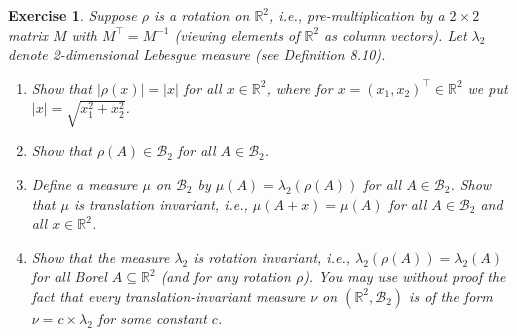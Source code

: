 \documentclass{article}
\newtheorem{exercise}[theorem]{Exercise}
\begin{document}
\begin{exercise}
    Suppose $\rho$ is a rotation on $\mathbb{R}^2$, i.e., pre-multiplication by a $2 \times 2$ matrix $M$ with $M^\top = M^{-1}$ (viewing elements of $\mathbb{R}^2$ as column vectors). Let $\lambda_2$ denote 2-dimensional Lebesgue measure (see Definition 8.10).
    \begin{enumerate}
        \item[(a)] Show that $|\rho(x)| = |x|$ for all $x \in \mathbb{R}^2$, where for $x = (x_1, x_2)^\top \in \mathbb{R}^2$ we put $|x| = \sqrt{x_1^2 + x_2^2}$.
        \item[(b)] Show that $\rho(A) \in \mathcal{B}_2$ for all $A \in \mathcal{B}_2$.
        \item[(c)] Define a measure $\mu$ on $\mathcal{B}_2$ by $\mu(A) = \lambda_2(\rho(A))$ for all $A \in \mathcal{B}_2$. Show that $\mu$ is translation invariant, i.e., $\mu(A + x) = \mu(A)$ for all $A \in \mathcal{B}_2$ and all $x \in \mathbb{R}^2$.
        \item[(d)] Show that the measure $\lambda_2$ is rotation invariant, i.e., $\lambda_2(\rho(A)) = \lambda_2(A)$ for all Borel $A \subseteq \mathbb{R}^2$ (and for any rotation $\rho$).
        \textit{You may use without proof the fact that every translation-invariant measure $\nu$ on $(\mathbb{R}^2, \mathcal{B}_2)$ is of the form $\nu = c \times \lambda_2$ for some constant $c$.}
    \end{enumerate}
\end{exercise}
\end{document}

